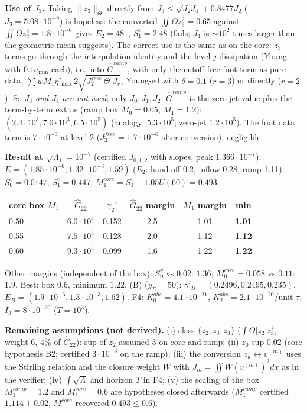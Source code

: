 \documentclass[11pt]{article}
\begin{document}
\textbf{Use of $J_3$.} Taking $\|z_3\|_\Theta$ directly from $J_3\le\sqrt{J_2J_4}+0.8477J_2$ ($J_3=5.08\cdot10^{-9}$) is hopeless: the converted $\iint\Theta z_3^2=0.65$ against $\iint\Theta z_2^2=1.8\cdot10^{-6}$ gives $E_2=481$, $S_1^v=2.48$ (fails; $J_4$ is $\sim10^2$ times larger than the geometric mean suggests). The correct use is the same as on the core: $z_3$ terms go through the interpolation identity and the level-$j$ dissipation (Young with $0.1a_{\min}$ each), i.e.\ into $\hat G^{ramp}$, with only the cutoff-free foot term as pure data, $\sum w M_1\eta'_{\max}\,2\sqrt{J^{free}_2\,\Theta\text{-}J_r}$, Young-ed with $\delta=0.1$ ($r=3$) or directly ($r=2$). So \emph{$J_3$ and $J_4$ are not used}; only $J_0,J_1,J_2$. $\hat G^{ramp}$ is the zero-jet value plus the term-by-term extras (ramp box $M_0=0.05$, $M_1=1.2$): $(2.4\cdot10^3,7.0\cdot10^3,6.5\cdot10^5)$ (analogy: $5.3\cdot10^5$; zero-jet $1.2\cdot10^5$). The foot data term is $7\cdot10^{-3}$ at level 2 ($J_2^{free}=1.7\cdot10^{-6}$ after conversion), negligible.

\textbf{Result at $\sqrt{\Lambda_1}=10^{-7}$} (certified $J_{0,1,2}$ with slopes, peak $1.366\cdot10^{-7}$): $E=(1.85\cdot10^{-6},1.32\cdot10^{-3},1.59)$ ($E_2$: hand-off 0.2, inflow 0.28, ramp 1.11); $S_0^v=0.0147$; $S_1^v=0.447$, $M_1^{core}=S_1^v+1.05U(60)=0.493$.
\begin{center}\small\begin{tabular}{lccccc}
core box $M_1$ & $\hat G_{22}$ & $\gamma_2'$ & $\hat G_{22}$ margin & $M_1$ margin & min\\\hline
0.50 & $6.0\cdot10^4$ & 0.152 & 2.5 & 1.01 & \textbf{1.01}\\
0.55 & $7.5\cdot10^4$ & 0.128 & 2.0 & 1.12 & \textbf{1.12}\\
0.60 & $9.3\cdot10^4$ & 0.099 & 1.6 & 1.22 & \textbf{1.22}
\end{tabular}\end{center}
Other margins (independent of the box): $S_0^v$ vs 0.02: $1.36$; $M_0^{core}=0.058$ vs $0.11$: $1.9$. Best: box $0.6$, minimum $1.22$. (B) ($y_E=50$): $\gamma'_B=(0.2496,0.2495,0.235)$, $E_B=(1.9\cdot10^{-6},1.3\cdot10^{-3},1.62)$. F4: $K_0^{abs}=4.1\cdot10^{-21}$, $K_2^{abs}=2.1\cdot10^{-20}$/unit $\tau$, $I_3=8\cdot10^{-20}$ ($T=10^3$).

\textbf{Remaining assumptions (not derived).} (i) class $\{z_2,z_3,z_3\}$ ($\int\Theta|z_2|z_3^2$, weight 6, 4\% of $\hat G_{22}$): sup of $z_2$ assumed $3$ on core and ramp; (ii) $z_0$ sup $0.02$ (core hypothesis B2; certified $3\cdot10^{-3}$ on the ramp); (iii) the conversion $z_k\leftrightarrow v^{(m)}$ uses the Stirling relation and the closure weight $W$ with $J_m=\iint W(v^{(m)})^2dx$ as in the verifier; (iv) $\int\sqrt\Lambda$ and horizon $T$ in F4; (v) the scaling of the box $M_1^{ramp}=1.2$ and $M_1^{core}=0.6$ are hypotheses closed afterwards ($M_1^{ramp}$ certified $1.114+0.02$, $M_1^{core}$ recovered $0.493\le0.6$).
\end{document}
